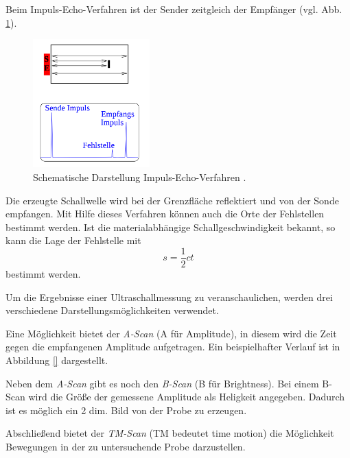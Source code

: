 Beim Impuls-Echo-Verfahren ist der Sender zeitgleich der Empfänger (vgl. Abb. \ref{fig: echo}).
\begin{figure}[h]
  \centering
  \includegraphics[width=0.4\textwidth]{pics/impuls_echo.png}
  \caption{Schematische Darstellung Impuls-Echo-Verfahren \cite{anleitungus1}.}
  \label{fig: echo}
  \end{figure}
Die erzeugte Schallwelle wird bei der Grenzfläche reflektiert und von der Sonde
empfangen. Mit Hilfe dieses Verfahren können auch die Orte der Fehlstellen bestimmt
werden. Ist die materialabhängige Schallgeschwindigkeit bekannt, so kann die
Lage der Fehlstelle mit
\begin{equation}
  \label{eq:lage_fehl}
  s=\frac{1}{2}ct
\end{equation}
bestimmt werden.

Um die Ergebnisse einer Ultraschallmessung zu veranschaulichen, werden drei verschiedene
Darstellungsmöglichkeiten verwendet.

Eine Möglichkeit bietet der \emph{A-Scan} (A für Amplitude), in diesem
wird die Zeit gegen die empfangenen Amplitude aufgetragen.
Ein beispielhafter Verlauf ist in Abbildung \ref{} dargestellt.

Neben dem \emph{A-Scan} gibt es noch den \emph{B-Scan} (B für Brightness).
Bei einem B-Scan wird die Größe der gemessene Amplitude als Heligkeit
angegeben. Dadurch ist es möglich ein 2 dim. Bild von der Probe zu erzeugen.

Abschließend bietet der \emph{TM-Scan} (TM bedeutet time motion) die Möglichkeit
Bewegungen in der zu untersuchende Probe darzustellen.
